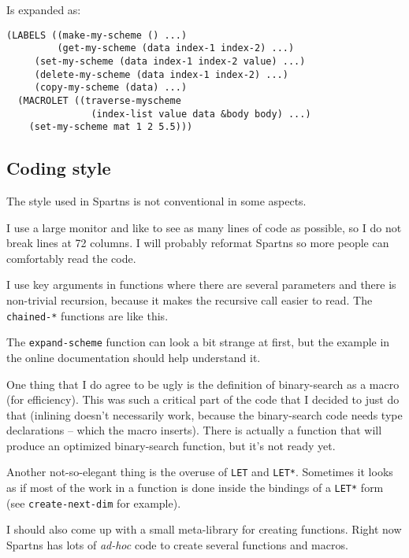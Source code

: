 \documentclass{article}
\begin{document}
Is expanded as:

\begin{lstlisting}
(LABELS ((make-my-scheme () ...)
         (get-my-scheme (data index-1 index-2) ...)
	 (set-my-scheme (data index-1 index-2 value) ...)
	 (delete-my-scheme (data index-1 index-2) ...)
	 (copy-my-scheme (data) ...)
  (MACROLET ((traverse-myscheme
               (index-list value data &body body) ...)
    (set-my-scheme mat 1 2 5.5)))
\end{lstlisting}

\subsection{Coding style}

The style used in Spartns is not conventional in some aspects.

I use a large monitor and like to see as many lines of code as possible, so
I do not break lines at 72 columns. I will probably reformat Spartns so more
people can comfortably read the code.

I use key arguments in functions where there are several parameters and
there is non-trivial recursion, because it makes the recursive call easier
to read. The \verb+chained-*+ functions are like this.

The \verb+expand-scheme+ function can look a bit strange at first, but the
example in the online documentation should help understand it.

One thing that I do agree to be ugly is the definition of binary-search as
a macro (for efficiency). This was such a critical part of the code that I
decided to just do that (inlining doesn't necessarily work, because the binary-search
code needs type declarations -- which the macro inserts).
There is actually a function that will produce an optimized binary-search function,
but it's not ready yet.

Another not-so-elegant thing is the overuse of \verb+LET+ and \verb+LET*+. Sometimes it
looks as if most of the work in a function is done inside the bindings of a
\verb+LET*+ form (see \verb+create-next-dim+ for example).

I should also come up with a small meta-library for creating functions. Right now
Spartns has lots of {\em ad-hoc} code to create several functions and macros.
\end{document}
